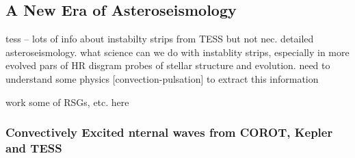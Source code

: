 {\color{blue}
\subsection{A New Era of Asteroseismology}

tess -- lots of info about instabilty strips from TESS but not nec. detailed asteroseismology.  what science can we do with instablity strips, especially in more evolved pars of HR disgram  probes of stellar structure and evolution.   need to understand some physics [convection-pulsation] to extract this information

work some of RSGs, etc. here

\subsubsection{Convectively Excited nternal waves from COROT, Kepler and TESS}


}